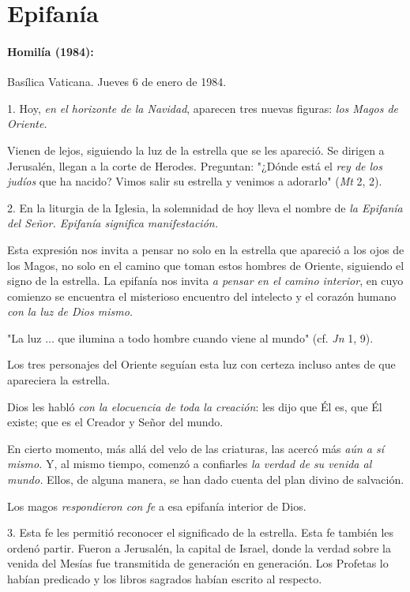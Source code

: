 \chapter{Epifanía}

\subsubsection{Homilía (1984): }

Basílica Vaticana. Jueves 6 de enero de 1984.

1. Hoy, \emph{en el horizonte de la Navidad}, aparecen tres nuevas
figuras: \emph{los Magos de Oriente.}

Vienen de lejos, siguiendo la luz de la estrella que se les apareció. Se
dirigen a Jerusalén, llegan a la corte de Herodes. Preguntan: "¿Dónde
está el \emph{rey de los judíos} que ha nacido? Vimos salir su estrella
y venimos a adorarlo" (\emph{Mt} 2, 2).

2. En la liturgia de la Iglesia, la solemnidad de hoy lleva el nombre de
\emph{la Epifanía del Señor. Epifanía significa manifestación.}

Esta expresión nos invita a pensar no solo en la estrella que apareció a
los ojos de los Magos, no solo en el camino que toman estos hombres de
Oriente, siguiendo el signo de la estrella. La epifanía nos invita
\emph{a pensar en el camino interior}, en cuyo comienzo se encuentra el
misterioso encuentro del intelecto y el corazón humano \emph{con la luz
	de Dios mismo.}

"La luz ... que ilumina a todo hombre cuando viene al mundo" (cf.
\emph{Jn} 1, 9).

Los tres personajes del Oriente seguían esta luz con certeza incluso
antes de que apareciera la estrella.

Dios les habló \emph{con la elocuencia de toda la creación}: les dijo
que Él es, que Él existe; que es el Creador y Señor del mundo.

En cierto momento, más allá del velo de las criaturas, las acercó más
\emph{aún a sí mismo.} Y, al mismo tiempo, comenzó a confiarles \emph{la
	verdad de su venida al mundo.} Ellos, de alguna manera, se han dado
cuenta del plan divino de salvación.

Los magos \emph{respondieron con fe} a esa epifanía interior de Dios.

3. Esta fe les permitió reconocer el significado de la estrella. Esta fe
también les ordenó partir. Fueron a Jerusalén, la capital de Israel,
donde la verdad sobre la venida del Mesías fue transmitida de generación
en generación. Los Profetas lo habían predicado y los libros sagrados
habían escrito al respecto.

